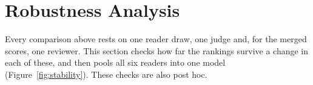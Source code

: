 \section{Robustness Analysis}
\label{sec:stability}
\label{sec:judge}

Every comparison above rests on one reader draw, one judge and, for the merged scores, one reviewer. This section checks how far the rankings survive a change in each of these, and then pools all six readers into one model (Figure~\ref{fig:stability}). These checks are also post hoc.



